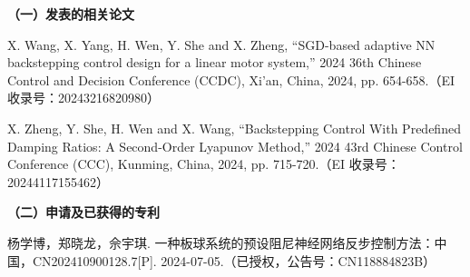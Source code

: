 \begin{publication}
\noindent\textbf{（一）发表的相关论文}
\begin{publist}
\item X. Wang, X. Yang, H. Wen, Y. She and X. Zheng, ``SGD-based adaptive NN backstepping control design for a linear motor system,'' 2024 36th Chinese Control and Decision Conference (CCDC), Xi'an, China, 2024, pp. 654-658.（EI 收录号：20243216820980）
\item X. Zheng, Y. She, H. Wen and X. Wang, ``Backstepping Control With Predefined Damping Ratios: A Second-Order Lyapunov Method,'' 2024 43rd Chinese Control Conference (CCC), Kunming, China, 2024, pp. 715-720.（EI 收录号：20244117155462）
\end{publist}

\noindent\textbf{（二）申请及已获得的专利}
\begin{publist}
\item 杨学博，郑晓龙，佘宇琪. 一种板球系统的预设阻尼神经网络反步控制方法：中国，CN202410900128.7[P]. 2024-07-05.（已授权，公告号：CN118884823B）
\end{publist}
\end{publication}
